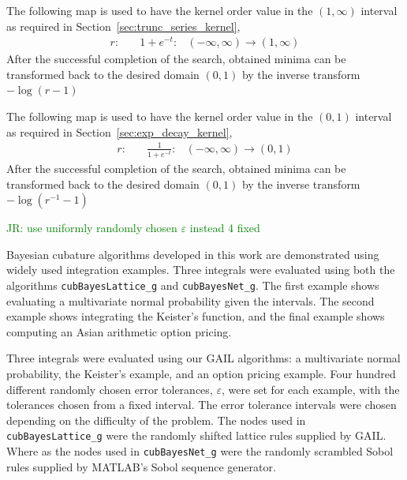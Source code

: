 \documentclass{iitthesis}          %
\newcommand{\code}[1]{\texttt{#1}}
\newcommand\secref{Section~\ref}
\newcommand{\JRNote}[1]{{\textcolor{green}{JR: #1}}}
\begin{document}
The following map is used to have the kernel order value in the $(1, \infty)$ interval as required in \secref{sec:trunc_series_kernel},
\begin{align*}
r: & \quad {1 + e^{-t}}: & (-\infty, \infty) \to (1,\infty)
\end{align*}
After the successful completion of the search, obtained minima can be transformed back to the desired domain $(0,1)$ by the inverse transform $-\log(r - 1) $


The following map is used to have the kernel order value in the $(0,1)$ interval as required in \secref{sec:exp_decay_kernel},
\begin{align*}
r: & \quad \frac{1}{1 + e^{-t}}: & (-\infty, \infty) \to (0, 1)
\end{align*}
After the successful completion of the search, obtained minima can be transformed back to the desired domain $(0,1)$ by the inverse transform $-\log( r^{-1} - 1) $


\clearpage



\label{sec:NumExp}

\JRNote{use uniformly randomly chosen $\varepsilon$ instead 4 fixed}

Bayesian cubature algorithms developed in this work are demonstrated using widely used integration examples.
Three integrals were evaluated using both the algorithms \code{cubBayesLattice\_g} and \code{cubBayesNet\_g}. The first example shows evaluating a multivariate normal probability given the intervals. The second example shows integrating the Keister's function, and the final example shows computing an Asian arithmetic option pricing.  

\label{sec:numerical_experiments_cubBayesLattice}

Three integrals were evaluated using our GAIL algorithms:  a multivariate normal probability, the Keister's example, and an option pricing example. 
Four hundred different randomly chosen error tolerances, $\varepsilon$,  were set for each example, with the tolerances chosen from a fixed interval. 
The error tolerance intervals were chosen depending on the difficulty of the problem.
The nodes used in \allowbreak \code{cubBayesLattice\_g} were the randomly shifted lattice rules supplied by GAIL.  
Where as the nodes used in \code{cubBayesNet\_g} were the randomly scrambled Sobol rules supplied by MATLAB's Sobol sequence generator. 
\end{document}

